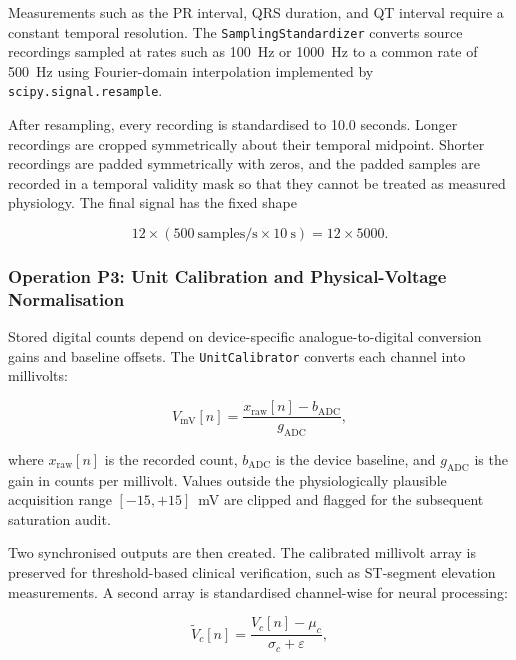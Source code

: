 \documentclass{ssnreview}
\begin{document}
Measurements such as the PR interval, QRS duration, and QT interval require a constant
temporal resolution. The \texttt{SamplingStandardizer} converts source recordings sampled
at rates such as 100~Hz or 1000~Hz to a common rate of 500~Hz using Fourier-domain
interpolation implemented by \texttt{scipy.signal.resample}.

After resampling, every recording is standardised to 10.0 seconds. Longer recordings are
cropped symmetrically about their temporal midpoint. Shorter recordings are padded
symmetrically with zeros, and the padded samples are recorded in a temporal validity mask
so that they cannot be treated as measured physiology. The final signal has the fixed
shape

\begin{equation}
  12\times(500\ \mathrm{samples/s}\times10\ \mathrm{s})
  =12\times5000.
\end{equation}

\subsubsection{Operation P3: Unit Calibration and Physical-Voltage Normalisation}

Stored digital counts depend on device-specific analogue-to-digital conversion gains and
baseline offsets. The \texttt{UnitCalibrator} converts each channel into millivolts:

\begin{equation}
  V_{\mathrm{mV}}[n]
  =\frac{x_{\mathrm{raw}}[n]-b_{\mathrm{ADC}}}{g_{\mathrm{ADC}}},
  \label{eq:adc-calibration}
\end{equation}

where $x_{\mathrm{raw}}[n]$ is the recorded count, $b_{\mathrm{ADC}}$ is the device
baseline, and $g_{\mathrm{ADC}}$ is the gain in counts per millivolt. Values outside the
physiologically plausible acquisition range $[-15,+15]$~mV are clipped and flagged for
the subsequent saturation audit.

Two synchronised outputs are then created. The calibrated millivolt array is preserved for
threshold-based clinical verification, such as ST-segment elevation measurements. A second
array is standardised channel-wise for neural processing:

\begin{equation}
  \widetilde{V}_{c}[n]
  =\frac{V_c[n]-\mu_c}{\sigma_c+\varepsilon},
  \label{eq:zscore}
\end{equation}
\end{document}

